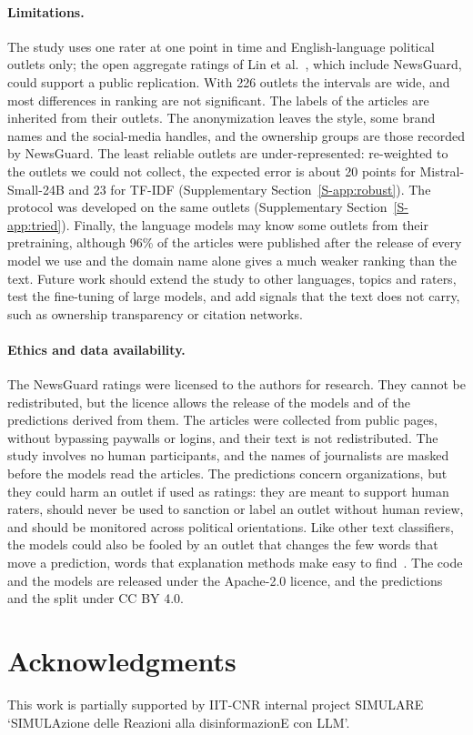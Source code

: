 \documentclass[11pt,a4paper]{article}
\begin{document}
\paragraph{Limitations.} The study uses one rater at one point in time and English-language political outlets only; the
open aggregate ratings of Lin et al.~\cite{lin2023high}, which include NewsGuard, could support a public replication.
With 226 outlets the intervals are wide, and most differences in ranking are not significant. The labels of the articles
are inherited from their outlets. The anonymization leaves the style, some brand names and the social-media handles, and
the ownership groups are those recorded by NewsGuard. The least reliable outlets are under-represented: re-weighted to
the outlets we could not collect, the expected error is about 20 points for Mistral-Small-24B and 23 for TF-IDF
(Supplementary Section~\ref{S-app:robust}). The protocol was developed on the same outlets (Supplementary
Section~\ref{S-app:tried}). Finally, the language models may know some outlets from their pretraining, although 96\% of
the articles were published after the release of every model we use and the domain name alone gives a much weaker
ranking than the text. Future work should extend the study to other languages, topics and raters, test the fine-tuning
of large models, and add signals that the text does not carry, such as ownership transparency or citation networks.

\paragraph{Ethics and data availability.}
The NewsGuard ratings were licensed to the authors for research. They cannot be redistributed, but the licence allows
the release of the models and of the predictions derived from them. The articles were collected from public pages,
without bypassing paywalls or logins, and their text is not redistributed. The study involves no human participants,
and the names of journalists are masked before the models read the articles. The predictions concern organizations, but
they could harm an outlet if used as ratings: they are meant to support human raters, should never be used to sanction
or label an outlet without human review, and should be monitored across political orientations. Like other text
classifiers, the models could also be fooled by an outlet that changes the few words that move a prediction, words that
explanation methods make easy to find~\cite{kozik2024explainability}. The code and the models are released under the
Apache-2.0 licence, and the predictions and the split under CC BY 4.0.

\section*{Acknowledgments}
This work is partially supported by IIT-CNR internal project SIMULARE `SIMULAzione delle Reazioni alla
disinformazionE con LLM'.



\end{document}
